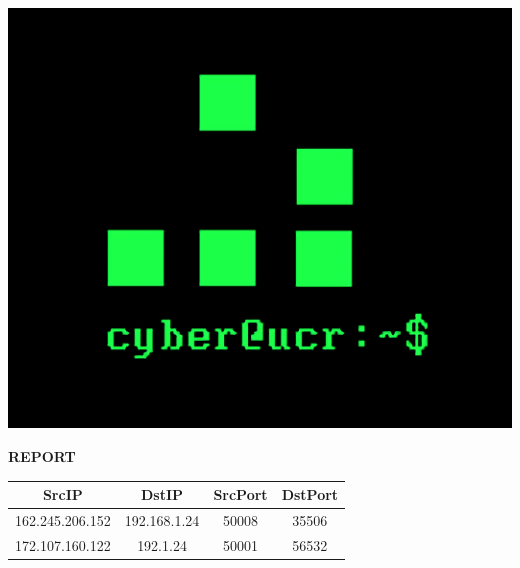 \documentclass{article}
\begin{document}
\begin{center}
	\includegraphics[scale=0.25]{Cyber_525x438.png}\\
\end{center}	
\centerline{\large \bf REPORT}
\begin{center}
 \begin{tabular}{||c c c c||} 
 \hline 
 SrcIP & DstIP & SrcPort & DstPort \\ [0.5ex]
 \hline\hline
162.245.206.152 & 192.168.1.24 & 50008 & 35506  \\
\hline
172.107.160.122 & 192.1.24 & 50001 & 56532  \\
\hline

\end{tabular}
\end{center}
\end{document}
